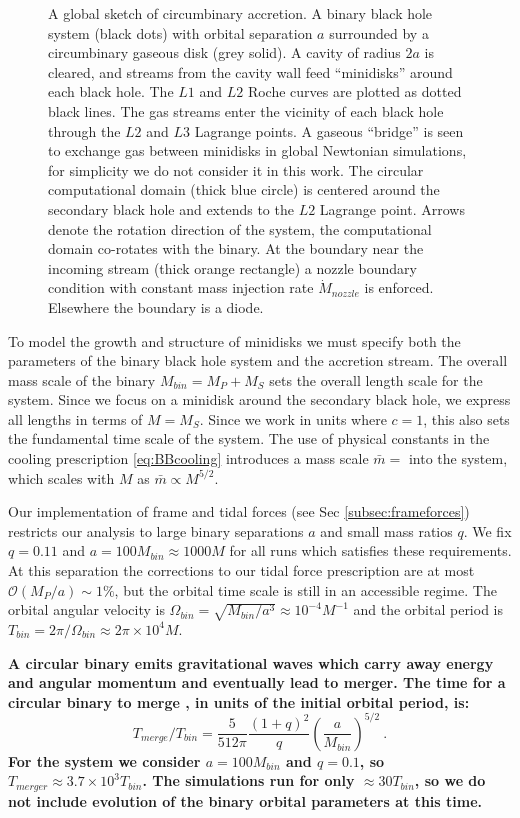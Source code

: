 \documentclass{emulateapj}
\newcommand{\Om}{\Omega}
\newcommand{\OO}{\mathcal{O}}
\begin{document}
\begin{figure}
\caption{\label{fi:domain} A global sketch of circumbinary accretion.  A binary black hole system (black dots) with orbital separation $a$ surrounded by a circumbinary gaseous disk (grey solid).  A cavity of radius $2a$ is cleared, and streams from the cavity wall feed ``minidisks'' around each black hole. The $L1$ and $L2$ Roche curves are plotted as dotted black lines.  The gas streams enter the vicinity of each black hole through the $L2$ and $L3$ Lagrange points.  A gaseous ``bridge'' is seen to exchange gas between minidisks in global Newtonian simulations, for simplicity we do not consider it in this work.  The circular computational domain (thick blue circle) is centered around the secondary black hole and extends to the $L2$ Lagrange point.  Arrows denote the rotation direction of the system, the computational domain co-rotates with the binary.  At the boundary near the incoming stream (thick orange rectangle) a nozzle boundary condition with constant mass injection rate $\dot{M}_{nozzle}$ is enforced.  Elsewhere the boundary is a diode.} 
\end{figure}

To model the growth and structure of minidisks we must specify both the parameters of the binary black hole system and the accretion stream.  The overall mass scale of the binary $M_{bin} = M_P+M_S$ sets the overall length scale for the system.  Since we focus on a minidisk around the secondary black hole, we express all lengths in terms of $M = M_S$.  Since we work in units where $c=1$, this also sets the fundamental time scale of the system. The use of physical constants in the cooling prescription \eqref{eq:BBcooling} introduces a mass scale $\bar{m}=$ into the system, which scales with $M$ as $\bar{m} \propto M^{5/2}$.  

Our implementation of frame and tidal forces (see Sec \ref{subsec:frameforces}) restricts our analysis to large binary separations $a$ and small mass ratios $q$.  We fix $q=0.11$ and $a = 100 M_{bin} \approx 1000 M$ for all runs which satisfies these requirements.  At this separation the corrections to our tidal force prescription are at most $\OO({M_P / a}) \sim 1\%$, but the orbital time scale is still in an accessible regime.  The orbital angular velocity is $\Om_{bin} = \sqrt{M_{bin} / a^3} \approx 10^{-4} M^{-1}$ and the orbital period is $T_{bin} = 2\pi / \Om_{bin} \approx 2 \pi \times 10^4 M$.

{\bf A circular binary emits gravitational waves which carry away energy and angular momentum and eventually lead to merger.  The time for a circular binary to merge \citep{Peters64}, in units of the initial orbital period, is:}
\begin{equation}
	T_{merge} / T_{bin} = \frac{5}{512 \pi}\frac{(1+q)^2}{q} \left(\frac{a}{M_{bin}}\right)^{5/2} \ . \label{eq:Tmerge}
\end{equation}
{\bf For the system we consider $a=100 M_{bin}$ and $q=0.1$, so $T_{merger} \approx 3.7\times 10^3 T_{bin}$.  The simulations run for only $\approx 30 T_{bin}$, so we do not include evolution of the binary orbital parameters at this time.}
\end{document}
